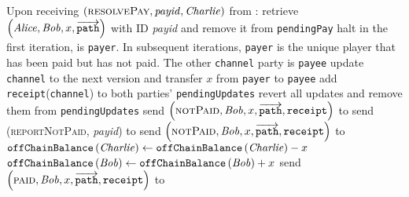 \begin{functionality}{\fpaynet}
\begin{algorithmic}[1]
    \State Upon receiving $\left(\textsc{resolvePay}, \mathit{payid},
    \mathit{Charlie}\right)$ from \simulator:
    \Indent
      \State retrieve $\left(\mathit{Alice}, \mathit{Bob}, x,
      \overrightarrow{\mathtt{path}}\right)$ with ID \textit{payid} and remove
      it from \texttt{pendingPay}
        \State halt 
        \State {}
      \EndIf
        \State in the first iteration, \charlie{} is \texttt{payer}. In
        subsequent iterations, \texttt{payer} is the unique player that has
        been paid but has not paid. The other \texttt{channel} party is
        \texttt{payee}
          \State update \texttt{channel} to the next version and transfer $x$
          from \texttt{payer} to \texttt{payee}
          \State add \texttt{receipt}(\texttt{channel}) to both parties'
          \texttt{pendingUpdates}
        \Else
          \State revert all updates and remove them from
          \texttt{pendingUpdates}
          \State {}
            \State send $\left(\textsc{notPaid}, \mathit{Bob}, x,
            \overrightarrow{\mathtt{path}}, \mathtt{receipt}\right)$ to \alice
          \Else
            \State send (\textsc{reportNotPaid}, \textit{payid}) to
            \simulator {}
              \State send $\left(\textsc{notPaid}, \mathit{Bob}, x,
              \overrightarrow{\mathtt{path}}, \mathtt{receipt}\right)$ to
              \alice
            \EndIf
          \EndIf
          \State {}
        \EndIf
      \EndFor
      \State $\mathtt{offChainBalance}\left(\mathit{Charlie}\right) \gets
      \mathtt{offChainBalance}\left(\mathit{Charlie}\right) - x$
      \State $\mathtt{offChainBalance}\left(\mathit{Bob}\right) \gets
      \mathtt{offChainBalance}\left(\mathit{Bob}\right) + x$
      \If{\charlie{} = \alice}
        \State send $\left(\textsc{paid}, \mathit{Bob}, x,
        \overrightarrow{\mathtt{path}}, \mathtt{receipt}\right)$ to \alice
      \EndIf
    \EndIndent
    \State


\end{algorithmic}
\end{functionality}
